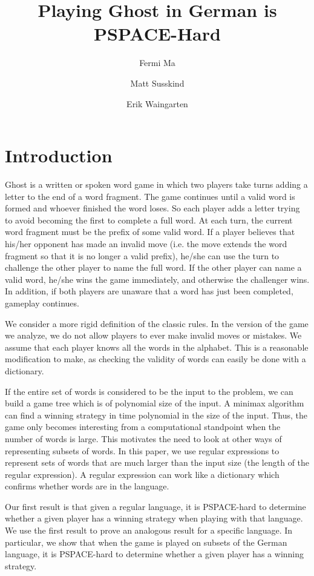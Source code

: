 \documentclass[11pt]{article}
\author{Fermi Ma \and Matt Susskind \and Erik Waingarten}
\title{Playing Ghost in German is PSPACE-Hard}
\begin{document}
         
\maketitle

\section{Introduction}

	Ghost is a written or spoken word game in which two players take turns adding a letter to the end of a word fragment. The game continues until a valid word is formed and whoever finished the word loses. So each player adds a letter trying to avoid becoming the first to complete a full word. At each turn, the current word fragment must be the prefix of some valid word. If a player believes that his/her opponent has made an invalid move (i.e. the move extends the word fragment so that it is no longer a valid prefix), he/she can use the turn to challenge the other player to name the full word. If the other player can name a valid word, he/she wins the game immediately, and otherwise the challenger wins. In addition, if both players are unaware that a word has just been completed, gameplay continues.

	We consider a more rigid definition of the classic rules. In the version of the game we analyze, we do not allow players to ever make invalid moves or mistakes. We assume that each player knows all the words in the alphabet. This is a reasonable modification to make, as checking the validity of words can easily be done with a dictionary.

	If the entire set of words is considered to be the input to the problem, we can build a game tree which is of polynomial size of the input. A minimax algorithm can find a winning strategy in time polynomial in the size of the input. Thus, the game only becomes interesting from a computational standpoint when the number of words is large. This motivates the need to look at other ways of representing subsets of words. In this paper, we use regular expressions to represent sets of words that are much larger than the input size (the length of the regular expression). A regular expression can work like a dictionary which confirms whether words are in the language.

	Our first result is that given a regular language, it is PSPACE-hard to determine whether a given player has a winning strategy when playing with that language. We use the first result to prove an analogous result for a specific language. In particular, we show that when the game is played on subsets of the German language, it is PSPACE-hard to determine whether a given player has a winning strategy.
\end{document}
